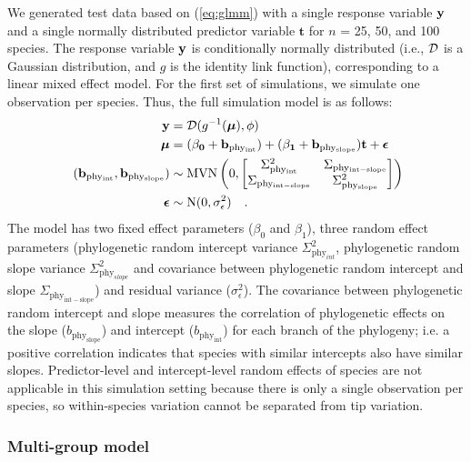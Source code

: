 \documentclass[12pt]{article}
\begin{document}
We generated test data based on (\ref{eq:glmm}) with a single response variable ${\mathbf y}$ and a single normally distributed predictor variable $\bm{t}$ for $n$ = 25, 50, and 100 species.
The response variable ${\mathbf y}$ is conditionally normally distributed (i.e., $\cal{D}$ is a Gaussian distribution, and $g$ is the identity link function), corresponding to a linear mixed effect model. 
For the first set of simulations, we simulate one observation per species.
Thus, the full simulation model is as follows:
\begin{equation}
\begin{aligned}
{\mathbf y} & = {\cal D}(g^{-1}({\boldsymbol \mu}), \phi) \\
{\boldsymbol \mu} & = (\bf{\beta_0 + b_{\mathrm{phy_{int}}}}) + (\bf{\beta_1 + b_{\mathrm{phy_{slope}}}}) \bm{t} + {\boldsymbol \epsilon} \\\
(\bf{b_{\mathrm{phy_{int}}}, b_{\mathrm{phy_{slope}}}}) & \sim \textrm{MVN} \left( 0, \begin{bmatrix}
\Sigma^2_{\mathrm{phy_{int}}} & \Sigma_{\mathrm{phy_{int-slope}}} \\ 
\Sigma_{\mathrm{phy_{int-slope}}} & \Sigma^2_{\mathrm{phy_{slope}}}
\end{bmatrix} 
\right) \\ 
{\boldsymbol \epsilon} & \sim \textrm{N} ( 0 , \sigma_{\epsilon}^2) \quad.
\label{eq:single_glmm}
\end{aligned}
\end{equation}
The model has two fixed effect parameters ($\beta_0$ and $\beta_1$), three random effect parameters (phylogenetic random intercept variance $\Sigma^2_{\mathrm{phy}_{int}}$, phylogenetic random slope variance $\Sigma^2_{\mathrm{phy}_{slope}}$ and covariance between phylogenetic random intercept and slope $\Sigma_{\mathrm{phy_{int-slope}}}$) and residual variance ($\sigma_{\epsilon}^2$).  
The covariance between phylogenetic random intercept and slope measures the correlation of phylogenetic effects on the slope ($b_{\mathrm{phy_{slope}}}$) and intercept ($b_{\mathrm{phy_{int}}}$) for each branch of the phylogeny; i.e. a positive correlation indicates that species with similar intercepts also have similar slopes.
Predictor-level and intercept-level random effects of species are not applicable in this simulation setting because there is only a single observation per species, so within-species variation cannot be separated from tip variation.

\subsubsection*{Multi-group model}
\end{document}
